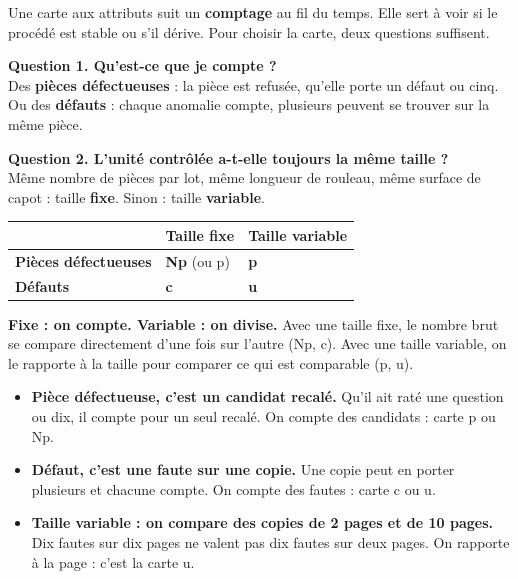 \documentclass[10pt,a4paper]{article}
\begin{document}
\thispagestyle{fancy}

Une carte aux attributs suit un \textbf{comptage} au fil du temps. Elle sert à voir si le procédé est stable ou s'il dérive. Pour choisir la carte, deux questions suffisent.

\begin{tcolorbox}[boite]
\textbf{Question 1. Qu'est-ce que je compte ?}\\
Des \textbf{pièces défectueuses} : la pièce est refusée, qu'elle porte un défaut ou cinq. Ou des \textbf{défauts} : chaque anomalie compte, plusieurs peuvent se trouver sur la même pièce.\par\smallskip
\textbf{Question 2. L'unité contrôlée a-t-elle toujours la même taille ?}\\
Même nombre de pièces par lot, même longueur de rouleau, même surface de capot : taille \textbf{fixe}. Sinon : taille \textbf{variable}.
\end{tcolorbox}

\begin{center}\renewcommand{\arraystretch}{1.6}
\begin{tabularx}{0.92\linewidth}{|>{\bfseries}p{38mm}|>{\centering\arraybackslash}X|>{\centering\arraybackslash}X|}\hline
 & \textbf{Taille fixe} & \textbf{Taille variable}\\\hline
Pièces défectueuses & \textbf{Np} (ou p) & \textbf{p}\\\hline
Défauts & \textbf{c} & \textbf{u}\\\hline
\end{tabularx}\end{center}

\begin{tcolorbox}[retenir]\textbf{Fixe : on compte. Variable : on divise.} Avec une taille fixe, le nombre brut se compare directement d'une fois sur l'autre (Np, c). Avec une taille variable, on le rapporte à la taille pour comparer ce qui est comparable (p, u).\end{tcolorbox}

\begin{itemize}
\item \textbf{Pièce défectueuse, c'est un candidat recalé.} Qu'il ait raté une question ou dix, il compte pour un seul recalé. On compte des candidats : carte p ou Np.
\item \textbf{Défaut, c'est une faute sur une copie.} Une copie peut en porter plusieurs et chacune compte. On compte des fautes : carte c ou u.
\item \textbf{Taille variable : on compare des copies de 2 pages et de 10 pages.} Dix fautes sur dix pages ne valent pas dix fautes sur deux pages. On rapporte à la page : c'est la carte u.
\end{itemize}
\end{document}
